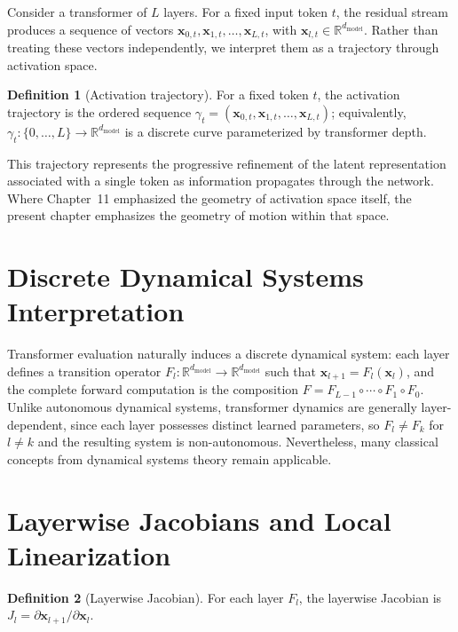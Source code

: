 \documentclass[11pt,twoside,openright]{book}
\numberwithin{equation}{chapter}
\theoremstyle{definition}
\newtheorem{definition}{Definition}[chapter]
\theoremstyle{plain}
\theoremstyle{remark}
\theoremstyle{definition}
\begin{document}
Consider a transformer of $L$ layers. For a fixed input token $t$, the
residual stream produces a sequence of vectors
$\mathbf{x}_{0,t},\mathbf{x}_{1,t},\ldots,\mathbf{x}_{L,t}$, with
$\mathbf{x}_{l,t}\in\mathbb{R}^{d_{\mathrm{model}}}$. Rather than treating
these vectors independently, we interpret them as a trajectory through
activation space.

\begin{definition}[Activation trajectory]
For a fixed token $t$, the activation trajectory is the ordered sequence
$\gamma_t=(\mathbf{x}_{0,t},\mathbf{x}_{1,t},\ldots,\mathbf{x}_{L,t})$;
equivalently, $\gamma_t:\{0,\ldots,L\}\to\mathbb{R}^{d_{\mathrm{model}}}$ is
a discrete curve parameterized by transformer depth.
\end{definition}

This trajectory represents the progressive refinement of the latent
representation associated with a single token as information propagates
through the network. Where Chapter~11 emphasized the geometry of
activation space itself, the present chapter emphasizes the geometry of
motion within that space.

\section{Discrete Dynamical Systems Interpretation}

Transformer evaluation naturally induces a discrete dynamical system:
each layer defines a transition operator
$F_l:\mathbb{R}^{d_{\mathrm{model}}}\to\mathbb{R}^{d_{\mathrm{model}}}$
such that $\mathbf{x}_{l+1}=F_l(\mathbf{x}_l)$, and the complete forward
computation is the composition $F=F_{L-1}\circ\cdots\circ F_1\circ F_0$.
Unlike autonomous dynamical systems, transformer dynamics are generally
layer-dependent, since each layer possesses distinct learned parameters,
so $F_l\neq F_k$ for $l\neq k$ and the resulting system is non-autonomous.
Nevertheless, many classical concepts from dynamical systems theory
remain applicable.

\section{Layerwise Jacobians and Local Linearization}

\begin{definition}[Layerwise Jacobian]
For each layer $F_l$, the layerwise Jacobian is
$J_l=\partial\mathbf{x}_{l+1}/\partial\mathbf{x}_l$.
\end{definition}
\end{document}
